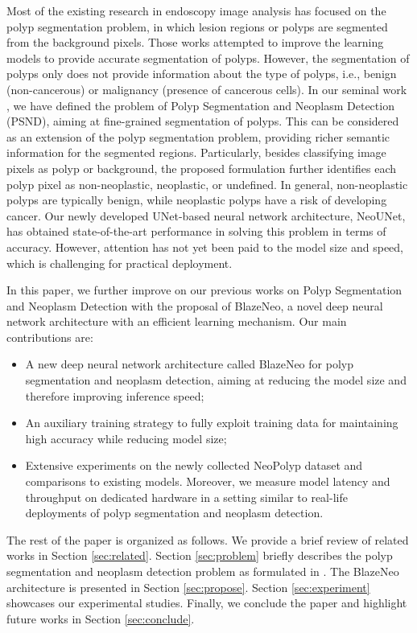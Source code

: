 \documentclass{ieeeaccess}
\newcommand{\ModelName}{BlazeNeo\xspace}
\newcommand{\DatasetName}{NeoPolyp\xspace}
\begin{document}
Most of the existing research in endoscopy image analysis has focused on the polyp segmentation problem, in which lesion regions or polyps are segmented from the background pixels. Those works attempted to improve the learning models to provide accurate segmentation of polyps. However, the segmentation of polyps only does not provide information about the type of polyps, i.e., benign (non-cancerous) or malignancy (presence of cancerous cells).
In our seminal work \cite{lan2021neounet}, we have defined the problem of Polyp Segmentation and Neoplasm Detection (PSND), aiming at fine-grained segmentation of polyps. This can be considered as an extension of the polyp segmentation problem, providing richer semantic information for the segmented regions. Particularly, besides classifying image pixels as polyp or background, the proposed formulation further identifies each polyp pixel as non-neoplastic, neoplastic, or undefined. In general, non-neoplastic polyps are typically benign, while neoplastic polyps have a risk of developing cancer.
Our newly developed UNet-based neural network architecture, NeoUNet, has obtained state-of-the-art performance in solving this problem in terms of accuracy. However, attention has not yet been paid to the model size and speed, which is challenging for practical deployment.

In this paper, we further improve on our previous works on Polyp Segmentation and Neoplasm Detection with the proposal of \ModelName{}, a novel deep neural network architecture with an efficient learning mechanism. Our main contributions are:
\begin{itemize}
\item A new deep neural network architecture called \ModelName{} for polyp segmentation and neoplasm detection, aiming at reducing the model size and therefore improving inference speed;
    \item An auxiliary training strategy to fully exploit training data for maintaining high accuracy while reducing model size;
    \item Extensive experiments on the newly collected \DatasetName dataset and comparisons to existing models. Moreover, we measure model latency and throughput on dedicated hardware in a setting similar to real-life deployments of polyp segmentation and neoplasm detection.
\end{itemize}

The rest of the paper is organized as follows. We provide a brief review of related works in Section \ref{sec:related}. Section \ref{sec:problem} briefly describes the polyp segmentation and neoplasm detection problem as formulated in \cite{lan2021neounet}. The \ModelName architecture is presented in Section \ref{sec:propose}. Section \ref{sec:experiment} showcases our experimental studies. Finally, we conclude the paper and highlight future works in Section \ref{sec:conclude}.
\end{document}
